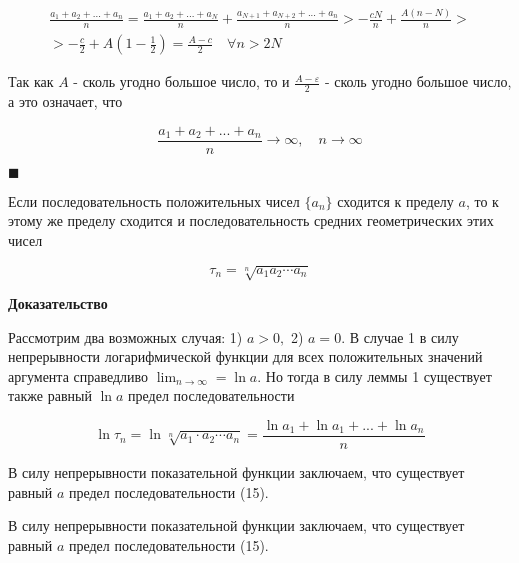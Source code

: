 \begin{enumerate}
	\begin{equation*}
		\begin{gathered}
			\frac{a_1 + a_2 + ... + a_n}{n} = \frac{a_1 + a_2 + ... + a_N}{n} + \frac{a_{N + 1} + a_{N + 2} + ... + a_n}{n} > -\frac{cN}{n} + \frac{A(n - N)}{n} > \\
			> -\frac{c}{2} + A(1 - \frac{1}{2}) = \frac{A - c}{2}\quad \forall n > 2N
		\end{gathered}
	\end{equation*}
	
	Так как $A$ - сколь угодно большое число, то и {\small $\frac{A - \varepsilon}{2}$} - сколь угодно большое число, а это означает, что
	
	\begin{equation*}
		\frac{a_1 + a_2 + ... + a_n}{n} \rightarrow \infty,\quad n \rightarrow \infty
	\end{equation*}
	
	\begin{flushright}
		$\blacksquare$
	\end{flushright}
\end{enumerate}

\begin{lemm}
	Если последовательность положительных чисел $\{a_n\}$ сходится к пределу $a$, то к этому же пределу сходится и последовательность средних геометрических этих чисел
	
	\begin{equation}
		\tau_n = \sqrt[n]{a_1a_2\cdots a_n}
	\end{equation}
\end{lemm}

\textbf{Доказательство}

Рассмотрим два возможных случая: 1) $a > 0,$ 2) $a = 0$. В случае 1 в силу непрерывности логарифмической функции для всех положительных значений аргумента справедливо $\displaystyle\lim_{n \rightarrow \infty} = \ln a$. Но тогда в силу леммы 1 существует также равный $\ln a$ предел последовательности

\begin{equation*}
	\ln \tau_n = \ln \sqrt[n]{a_1\cdot a_2 \cdots a_n} = \frac{\ln a_1 + \ln a_1 + ... + \ln a_n}{n}
\end{equation*}

В силу непрерывности показательной функции заключаем, что существует равный $a$ предел последовательности (15).

В силу непрерывности показательной функции заключаем, что существует равный $a$ предел последовательности (15).

